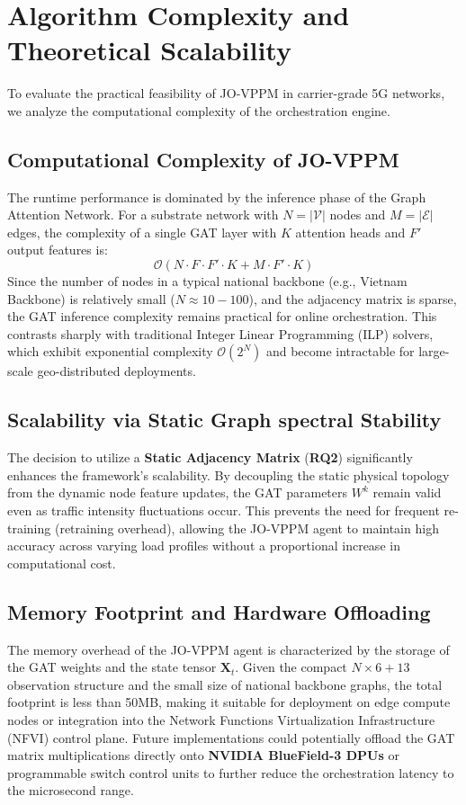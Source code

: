 \documentclass[12pt, a4paper, reqno, oneside]{book}
\begin{document}
\section{Algorithm Complexity and Theoretical Scalability}
To evaluate the practical feasibility of JO-VPPM in carrier-grade 5G networks, we analyze the computational complexity of the orchestration engine.

\subsection{Computational Complexity of JO-VPPM}
The runtime performance is dominated by the inference phase of the Graph Attention Network. For a substrate network with $N = |\mathcal{V}|$ nodes and $M = |\mathcal{E}|$ edges, the complexity of a single GAT layer with $K$ attention heads and $F'$ output features is:
\begin{equation}
\mathcal{O}(N \cdot F \cdot F' \cdot K + M \cdot F' \cdot K)
\end{equation}
Since the number of nodes in a typical national backbone (e.g., Vietnam Backbone) is relatively small ($N \approx 10-100$), and the adjacency matrix is sparse, the GAT inference complexity remains practical for online orchestration. This contrasts sharply with traditional Integer Linear Programming (ILP) solvers, which exhibit exponential complexity $\mathcal{O}(2^N)$ and become intractable for large-scale geo-distributed deployments.

\subsection{Scalability via Static Graph spectral Stability}
The decision to utilize a \textbf{Static Adjacency Matrix} (\textbf{RQ2}) significantly enhances the framework's scalability. By decoupling the static physical topology from the dynamic node feature updates, the GAT parameters $W^k$ remain valid even as traffic intensity fluctuations occur. This prevents the need for frequent re-training (retraining overhead), allowing the JO-VPPM agent to maintain high accuracy across varying load profiles without a proportional increase in computational cost.

\subsection{Memory Footprint and Hardware Offloading}
The memory overhead of the JO-VPPM agent is characterized by the storage of the GAT weights and the state tensor $\mathbf{X}_t$. Given the compact $N \times 6 + 13$ observation structure and the small size of national backbone graphs, the total footprint is less than 50MB, making it suitable for deployment on edge compute nodes or integration into the Network Functions Virtualization Infrastructure (NFVI) control plane. Future implementations could potentially offload the GAT matrix multiplications directly onto \textbf{NVIDIA BlueField-3 DPUs} or programmable switch control units to further reduce the orchestration latency to the microsecond range.
\end{document}

